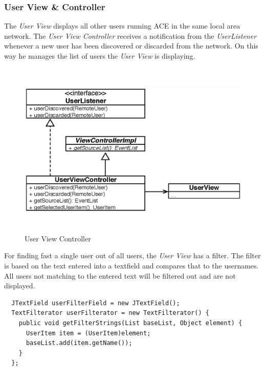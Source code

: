 \subsubsection{User View \& Controller}
The \textit{User View} displays all other users running ACE in the same local area network. The \textit{User View Controller} receives a notification from the \textit{UserListener} whenever a new user has been discovered or discarded from the network. On this way he manages the list of users the \textit{User View} is displaying.
\begin{figure}[H]
\begin{center}
  \includegraphics[height=3.33in, width=5.62in]{../images/finalreport/application_userview.eps}
\caption{User View Controller}
\label{application_userview}
\end{center}
\end{figure}
For finding fast a single user out of all users, the \textit{User View} has a filter. The filter is based on the text entered into a textfield and compares that to the usernames. All users not matching to the entered text will be filtered out and are not displayed.
\begin{verbatim}
  JTextField userFilterField = new JTextField();
  TextFilterator userFilterator = new TextFilterator() {
    public void getFilterStrings(List baseList, Object element) {
      UserItem item = (UserItem)element;
      baseList.add(item.getName());
    }
  };
\end{verbatim}

